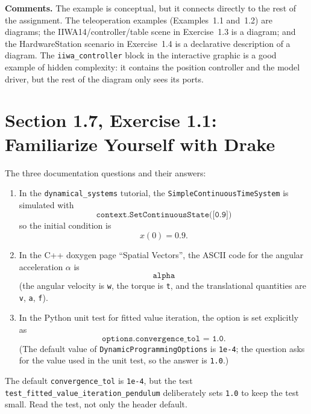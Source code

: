 \documentclass[11pt]{article}
\begin{document}
\textbf{Comments.}  The example is conceptual, but it connects directly to the
rest of the assignment.  The teleoperation examples (Examples~1.1 and~1.2) are
diagrams; the IIWA14/controller/table scene in Exercise~1.3 is a diagram; and
the HardwareStation scenario in Exercise~1.4 is a declarative description of a
diagram.  The \texttt{iiwa\_controller} block in the interactive graphic is a
good example of hidden complexity: it contains the position controller and the
model driver, but the rest of the diagram only sees its ports.

\section{Section 1.7, Exercise 1.1: Familiarize Yourself with Drake}

The three documentation questions and their answers:

\begin{enumerate}[leftmargin=1.4em,itemsep=4pt]
  \item In the \texttt{dynamical\_systems} tutorial, the
        \texttt{SimpleContinuousTimeSystem} is simulated with
        \[
        \texttt{context.SetContinuousState([0.9])}
        \]
        so the initial condition is
        \[
        \boxed{x(0)=0.9.}
        \]
  \item In the C++ doxygen page ``Spatial Vectors'', the ASCII code for the
        angular acceleration $\alpha$ is
        \[
        \boxed{\texttt{alpha}}
        \]
        (the angular velocity is \texttt{w}, the torque is \texttt{t}, and
        the translational quantities are \texttt{v}, \texttt{a}, \texttt{f}).
  \item In the Python unit test for fitted value iteration, the option is set
        explicitly as
        \[
        \texttt{options.convergence\_tol = 1.0.}
        \]
        (The default value of \texttt{DynamicProgrammingOptions} is
        \texttt{1e-4}; the question asks for the value used in the unit test,
        so the answer is \texttt{1.0}.)
\end{enumerate}

\begin{pitfall}[title={Default vs.\ test value}]
The default \texttt{convergence\_tol} is \texttt{1e-4}, but the test
\texttt{test\_fitted\_value\_iteration\_pendulum} deliberately sets
\texttt{1.0} to keep the test small.  Read the test, not only the header
default.
\end{pitfall}
\end{document}
